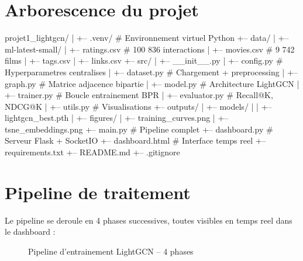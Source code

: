 \documentclass[12pt,a4paper]{report}
\begin{document}
\section{Arborescence du projet}

\begin{arbobox}
projet1\_lightgcn/
|
+-- .venv/                   \# Environnement virtuel Python
+-- data/
|   +-- ml-latest-small/
|       +-- ratings.csv      \# 100 836 interactions
|       +-- movies.csv       \# 9 742 films
|       +-- tags.csv
|       +-- links.csv
+-- src/
|   +-- \_\_init\_\_.py
|   +-- config.py            \# Hyperparametres centralises
|   +-- dataset.py           \# Chargement + preprocessing
|   +-- graph.py             \# Matrice adjacence bipartie
|   +-- model.py             \# Architecture LightGCN
|   +-- trainer.py           \# Boucle entrainement BPR
|   +-- evaluator.py         \# Recall@K, NDCG@K
|   +-- utils.py             \# Visualisations
+-- outputs/
|   +-- models/
|   |   +-- lightgcn\_best.pth
|   +-- figures/
|       +-- training\_curves.png
|       +-- tsne\_embeddings.png
+-- main.py                  \# Pipeline complet
+-- dashboard.py             \# Serveur Flask + SocketIO
+-- dashboard.html           \# Interface temps reel
+-- requirements.txt
+-- README.md
+-- .gitignore
\end{arbobox}

\section{Pipeline de traitement}

Le pipeline se deroule en 4 phases successives, toutes visibles
en temps reel dans le dashboard :

\begin{figure}[H]
\centering
{}
\caption{Pipeline d'entrainement LightGCN -- 4 phases}
\end{figure}
\end{document}
